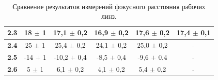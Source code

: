\begin{table}[h]
\begin{tabular}{|c|c|ccc|c|}
\textbf{2.3}                                                                    & 18 $\pm$ 1                                                                                                               & \multicolumn{1}{c|}{17,1 $\pm$ 0,2}             & \multicolumn{1}{c|}{16,9 $\pm$ 0,2}             & 17,6 $\pm$ 0,2           & 17,4 $\pm$ 0,1                                                                                      \\ \hline
\textbf{2.4}                                                                    & 25 $\pm$ 1                                                                                                               & \multicolumn{1}{c|}{25,4 $\pm$ 0,2}             & \multicolumn{1}{c|}{24,1 $\pm$ 0,2}             & 25,0 $\pm$ 0,2           & -                                                                                                     \\ \hline
\textbf{2.5}                                                                    & -14 $\pm$ 1                                                                                                              & \multicolumn{1}{c|}{-10,2 $\pm$ 0,4}            & \multicolumn{1}{c|}{-8,5 $\pm$ 0,4}             & -9,6 $\pm$ 0,4           & -                                                                                                     \\ \hline
\textbf{2.6}                                                                    & 5 $\pm$ 1                                                                                                                & \multicolumn{1}{c|}{6,1 $\pm$ 0,2}              & \multicolumn{1}{c|}{4,1 $\pm$ 0,2}              & 5,4 $\pm$ 0,2            & -                                                                                                     \\ \hline
\end{tabular}
\caption{Сравнение результатов измерений фокусного расстояния рабочих линз.}
\label{tab:focus}
\end{table}